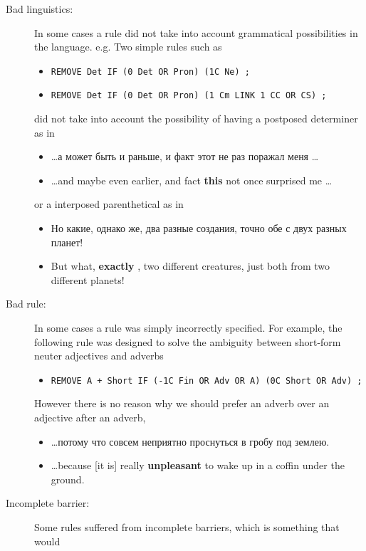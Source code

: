 \documentclass[11pt]{article}
\newcommand{\rus}[1]{\foreignlanguage{russian}{#1}}
\begin{document}


\begin{description}
  \item[ Bad linguistics:] In some cases a rule did not take into account grammatical possibilities 
    in the language. e.g. Two simple rules such as 
    \begin{itemize}
      \item \texttt{REMOVE Det IF (0 Det OR Pron) (1C Ne) ;}
      \item \texttt{REMOVE Det IF (0 Det OR Pron) (1 Cm LINK 1 CC OR CS) ;}
    \end{itemize}
    did not take into account the possibility of having a postposed determiner as in
    \begin{itemize}
      \item \ldots \rus{а может быть и раньше, и факт этот не раз поражал меня} \ldots
      \item \ldots and maybe even earlier, and fact \textbf{this} not once surprised me \ldots
    \end{itemize}
    or a interposed parenthetical as in
    \begin{itemize}
      \item \rus{Но какие, однако же, два разные создания, точно обе с двух разных планет!}
      \item But what, \textbf{exactly} , two different creatures, just both from two different planets!
    \end{itemize}
  \item[ Bad rule:] In some cases a rule was simply incorrectly specified. For example, the 
    following rule was designed to solve the ambiguity between short-form neuter adjectives and 
    adverbs
   \begin{itemize}
     \item \texttt{REMOVE A + Short IF (-1C Fin OR Adv OR A) (0C Short OR Adv) ;}
   \end{itemize}
   However there is no reason why we should prefer an adverb over an adjective after an adverb, 
   \begin{itemize}
     \item \ldots \rus{потому что совсем неприятно проснуться в гробу под землею.}
     \item \ldots because [it is] really \textbf{unpleasant} to wake up in a coffin under the ground.
   \end{itemize}
  \item[ Incomplete barrier:]  Some rules suffered from incomplete barriers, which is something that would

\end{description}
\end{document}
